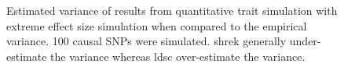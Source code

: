 \begin{figure}
{				
				\label{fig:ldscInQtEx100cVarCom}
			}
			\caption[Quantitative Trait with Extreme Effect Size Simulation Result(100 causal SNPs, Estimated Variance)]
			{Estimated variance of results from quantitative trait simulation with extreme effect size simulation when compared to the empirical variance.
				100 causal \glspl{SNP} were simulated.
				\gls{shrek} generally under-estimate the variance whereas \gls{ldsc} over-estimate the variance.
			} 
			\label{fig:QtEx100cVarCom}
		\end{figure}